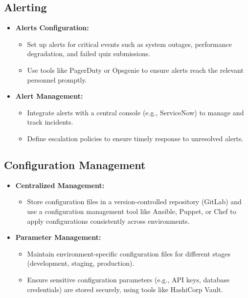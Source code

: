 \subsection{Alerting}

\begin{itemize}
    \item \textbf{Alerts Configuration:}
          \begin{itemize}
              \item Set up alerts for critical events such as system outages, performance degradation, and failed quiz submissions.
              \item Use tools like PagerDuty or Opsgenie to ensure alerts reach the relevant personnel promptly.
          \end{itemize}
    \item \textbf{Alert Management:}
          \begin{itemize}
              \item Integrate alerts with a central console (e.g., ServiceNow) to manage and track incidents.
              \item Define escalation policies to ensure timely response to unresolved alerts.
          \end{itemize}
\end{itemize}


\subsection{Configuration Management}

\begin{itemize}
    \item \textbf{Centralized Management:}
          \begin{itemize}
              \item Store configuration files in a version-controlled repository (GitLab) and use a configuration management tool like Ansible, Puppet, or Chef to apply configurations consistently across environments.
          \end{itemize}
    \item \textbf{Parameter Management:}
          \begin{itemize}
              \item Maintain environment-specific configuration files for different stages (development, staging, production).
              \item Ensure sensitive configuration parameters (e.g., API keys, database credentials) are stored securely, using tools like HashiCorp Vault.
          \end{itemize}
\end{itemize}


